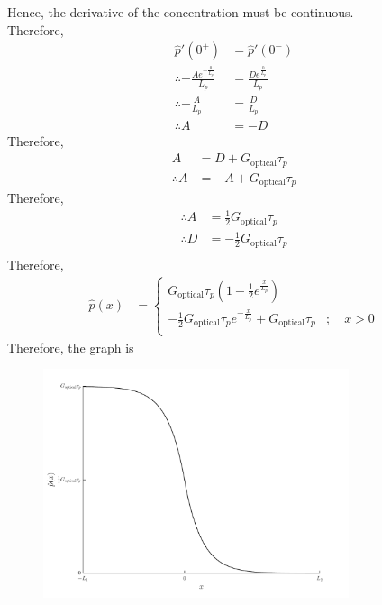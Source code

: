 \documentclass[titlepage, fleqn, a4paper, 12pt, twoside]{article}
\theoremstyle{definition}
\theoremstyle{theorem}
\begin{document}
\begin{solution}
	Hence, the derivative of the concentration must be continuous.\\
	Therefore,
	\begin{align*}
		\hat{p}'(0^+) &= \hat{p}'(0^-)\\
		\therefore -\frac{A e^{-\frac{0}{L_p}}}{L_p} &= \frac{D e^{\frac{0}{L_p}}}{L_p}\\
		\therefore -\frac{A}{L_p} &= \frac{D}{L_p}\\
		\therefore A &= -D
	\end{align*}
	Therefore,
	\begin{align*}
		A &= D + G_{\text{optical}} \tau_p\\
		\therefore A &= -A + G_{\text{optical}} \tau_p
	\end{align*}
	Therefore,
	\begin{align*}
		\therefore A &= \frac{1}{2} G_{\text{optical}} \tau_p\\
		\therefore D &= -\frac{1}{2} G_{\text{optical}} \tau_p\\
	\end{align*}
	Therefore,
	\begin{align*}
		\hat{p}(x) &=
			\begin{cases}
				G_{\text{optical}} \tau_p \left( 1 - \frac{1}{2} e^{\frac{x}{L_p}} \right)\\
				-\frac{1}{2} G_{\text{optical}} \tau_p e^{-\frac{x}{L_p}} + G_{\text{optical}} \tau_p &;\quad x > 0\\
			\end{cases}
	\end{align*}
	Therefore, the graph is
	\begin{figure}[H]
		\centering
		\includegraphics[width = 0.8\textwidth]{fig-carrier_concentration_for_partly_illuminated_long_semiconductor.pdf}
	\end{figure}
\end{solution}
\end{document}
